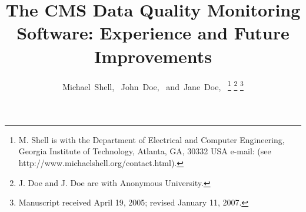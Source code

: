 \documentclass[journal]{IEEEtran}
\begin{document}
%
\title{The CMS Data Quality Monitoring Software: Experience and Future Improvements}
%
%
%

\author{Michael~Shell,~
        John~Doe,~
        and~Jane~Doe,~%
\thanks{M. Shell is with the Department
of Electrical and Computer Engineering, Georgia Institute of Technology, Atlanta,
GA, 30332 USA e-mail: (see http://www.michaelshell.org/contact.html).}%
\thanks{J. Doe and J. Doe are with Anonymous University.}%
\thanks{Manuscript received April 19, 2005; revised January 11, 2007.}}

% 
%



% 
\end{document}
